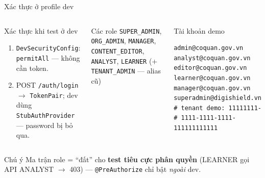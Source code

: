 \documentclass[aspectratio=169,12pt]{beamer}
\begin{document}
\begin{frame}[fragile]{Xác thực ở profile dev}
  \begin{columns}[T]
    \begin{block}{Xác thực khi test ở dev}
      \begin{enumerate}\small
        \item \texttt{DevSecurityConfig}: \texttt{permitAll} --- không
          cần token.
        \item POST \texttt{/auth/login} $\to$ \texttt{TokenPair}; dev
          dùng \texttt{StubAuthProvider} --- password bị bỏ qua.
      \end{enumerate}
    \end{block}

    \begin{block}{Các role}
      \footnotesize \texttt{SUPER\_ADMIN}, \texttt{ORG\_ADMIN},
      \texttt{MANAGER}, \texttt{CONTENT\_EDITOR}, \texttt{ANALYST},
      \texttt{LEARNER} (+ \texttt{TENANT\_ADMIN} --- alias cũ)
    \end{block}

    \begin{exampleblock}{Tài khoản demo}
\begin{lstlisting}[language={}]
admin@coquan.gov.vn
analyst@coquan.gov.vn
editor@coquan.gov.vn
learner@coquan.gov.vn
manager@coquan.gov.vn
superadmin@digishield.vn
# tenant demo: 11111111-
# 1111-1111-1111-111111111111
\end{lstlisting}
    \end{exampleblock}
  \end{columns}

  \vspace{-0.3em}
  \begin{alertblock}{Chú ý}
    \small Ma trận role = ``đất'' cho \textbf{test tiêu cực phân quyền}
    (LEARNER gọi API ANALYST $\to$ 403) --- \texttt{@PreAuthorize} chỉ
    bật \emph{ngoài} dev.
  \end{alertblock}
\end{frame}
\end{document}
